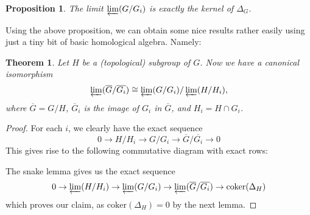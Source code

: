 \documentclass[12pt,a4paper,leqno]{article}
\newcommand{\coker}{\mathrm{coker}}
\newcommand{\plim}{\varprojlim}
\theoremstyle{plain}
\newtheorem{thm}[theo]{Theorem}
\newtheorem{prop}[theo]{Proposition}
\theoremstyle{definition}
\theoremstyle{remark}
\begin{document}
\begin{prop}
The limit $\varprojlim (G / G_i)$ is exactly the kernel of $\Delta_G$.
\end{prop}

Using the above proposition, we can obtain some nice results rather easily using just a tiny bit of basic homological algebra. Namely:

\begin{thm}\label{ExactCompletion}
Let $H$ be a (topological) subgroup of $G$. Now we have a canonical isomorphism
\begin{equation*}
\plim (\overline{G} / \overline{G_i}) \cong \plim (G / G_i) / \plim (H / H_i), 
\end{equation*}
where $\overline G = G/H$, $\overline G_i$ is the image of $G_i$ in $\overline G$, and $H_i = H \cap G_i$.
\end{thm}
\begin{proof}
For each $i$, we clearly have the exact sequence
\begin{equation*}
0 \to H / H_i \to G / G_i \to \overline{G} / \overline{G_i} \to 0
\end{equation*}
This gives rise to the following commutative diagram with exact rows:
\begin{center}
\end{center}
The snake lemma gives us the exact sequence
\begin{equation*}
0 \to \plim (H / H_i) \to \plim (G / G_i) \to \plim (\overline{G} / \overline{G_i}) \to \coker(\Delta_H)
\end{equation*}
which proves our claim, as $\coker(\Delta_H) = 0$ by the next lemma.
\end{proof}
\end{document}
